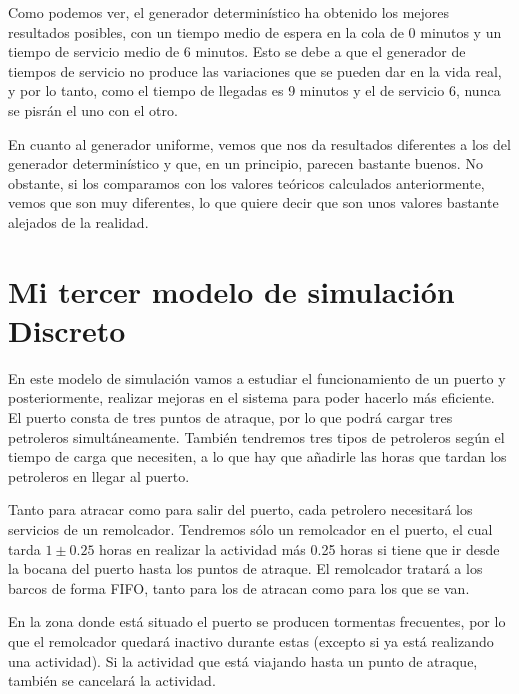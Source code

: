 \documentclass[11pt,a4paper]{report}
\begin{document}
Como podemos ver, el generador determinístico ha obtenido los mejores resultados posibles, con un tiempo medio de espera en la cola de 0 minutos y un tiempo
de servicio medio de 6 minutos. Esto se debe a que el generador de tiempos de servicio no produce las variaciones que se pueden dar en la vida real, y por lo
tanto, como el tiempo de llegadas es 9 minutos y el de servicio 6, nunca se pisrán el uno con el otro.

En cuanto al generador uniforme, vemos que nos da resultados diferentes a los del generador determinístico y que, en un principio, parecen bastante buenos. No
obstante, si los comparamos con los valores teóricos calculados anteriormente, vemos que son muy diferentes, lo que quiere decir que son unos valores bastante
alejados de la realidad.




\chapter{Mi tercer modelo de simulación Discreto}

En este modelo de simulación vamos a estudiar el funcionamiento de un puerto y posteriormente, realizar mejoras en el sistema para poder hacerlo más eficiente.
El puerto consta de tres puntos de atraque, por lo que podrá cargar tres petroleros simultáneamente. También tendremos tres tipos de petroleros según el tiempo
de carga que necesiten, a lo que hay que añadirle las horas que tardan los petroleros en llegar al puerto.

Tanto para atracar como para salir del puerto, cada petrolero necesitará los servicios de un remolcador. Tendremos sólo un remolcador en el puerto, el cual tarda
$1 \pm 0.25$ horas en realizar la actividad más 0.25 horas si tiene que ir desde la bocana del puerto hasta los puntos de atraque. El remolcador tratará a los
barcos de forma FIFO, tanto para los de atracan como para los que se van.

En la zona donde está situado el puerto se producen tormentas frecuentes, por lo que el remolcador quedará inactivo durante estas (excepto si ya está realizando
una actividad). Si la actividad que está viajando hasta un punto de atraque, también se cancelará la actividad.
\end{document}
